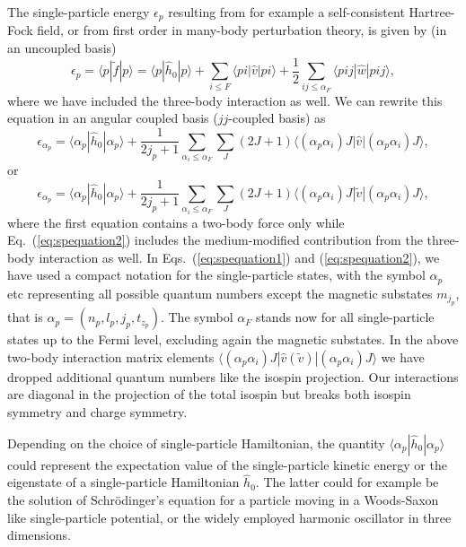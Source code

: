 \documentclass[preprint,12pt,authoryear]{elsarticle}
\begin{document}
The single-particle energy $\epsilon_p$ resulting from for example a self-consistent Hartree-Fock field, 
or from  first order in many-body perturbation theory, is given by (in an uncoupled basis)
\[
\epsilon_p=\langle p| \tilde{f}|p\rangle = \langle p|\hat{h}_0|p\rangle +\sum_{i\le F} \langle pi|\hat{v}|pi\rangle+\frac{1}{2}\sum_{ij\le\alpha_F} \langle pij|\hat{w}|pij\rangle,
\]
where we have included the three-body interaction as well.
We can rewrite this equation in an angular coupled basis ($jj$-coupled basis) as 
\begin{equation}
\epsilon_{\alpha_p}= \langle \alpha_p|\hat{h}_0|\alpha_p\rangle+\frac{1}{2j_p+1}\sum_{\alpha_i\le \alpha_F}\sum_{J} (2J+1)\langle (\alpha_p\alpha_i)J | \hat{v} | (\alpha_p\alpha_i)J \rangle,
\label{eq:spequation1}
\end{equation}
or
\begin{equation}
\epsilon_{\alpha_p}= \langle \alpha_p|\hat{h}_0|\alpha_p\rangle+\frac{1}{2j_p+1}\sum_{\alpha_i\le \alpha_F}\sum_{J} (2J+1)\langle (\alpha_p\alpha_i)J | \tilde{v} | (\alpha_p\alpha_i)J \rangle,
\label{eq:spequation2}
\end{equation}
where the first equation contains a two-body force only while
Eq.~(\ref{eq:spequation2}) includes the medium-modified contribution
from the three-body interaction as well. In
Eqs.~(\ref{eq:spequation1}) and (\ref{eq:spequation2}), we have
used a compact notation for the single-particle states, with the
symbol $\alpha_p$ etc representing all possible quantum numbers except
the magnetic substates $m_{j_p}$, that is $\alpha_p=(n_p,l_p,j_p,t_{z_p})$. The symbol $\alpha_F$ stands now for
all single-particle states up to the Fermi level, excluding again the
magnetic substates.  In the above two-body interaction matrix elements
$\langle (\alpha_p\alpha_i)J | \hat{v}(\tilde{v}) |(\alpha_p\alpha_i)J \rangle$ we have dropped additional quantum
numbers like the isospin projection. Our interactions are diagonal in
the projection of the total isospin but breaks both isospin symmetry
and charge symmetry.

Depending on the choice of single-particle Hamiltonian, the quantity
$\langle \alpha_p|\hat{h}_0|\alpha_p\rangle$ could represent the expectation value of the single-particle
kinetic energy or the eigenstate of a single-particle Hamiltonian
$\hat{h}_0$. The latter could for example be the solution of
Schr\"odinger's equation for a particle moving in a Woods-Saxon like
single-particle potential, or the widely employed harmonic oscillator
in three dimensions.
\end{document}
